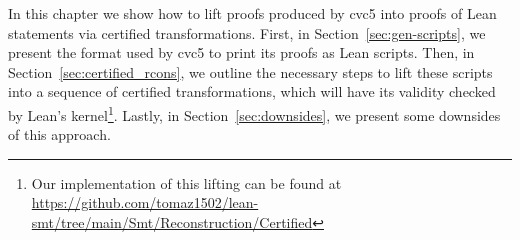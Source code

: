 In this chapter we show how to lift proofs produced by cvc5 into
proofs of Lean statements via certified transformations.
First, in Section~\ref{sec:gen-scripts}, we present the format used by
cvc5 to print its proofs as Lean scripts.
Then, in Section~\ref{sec:certified_rcons}, we outline the necessary
steps to lift these scripts into a sequence of certified transformations,
which will have its validity checked by Lean's kernel\footnote{Our implementation of this lifting can be found at \url{https://github.com/tomaz1502/lean-smt/tree/main/Smt/Reconstruction/Certified}}.
Lastly, in Section~\ref{sec:downsides}, we present some downsides of this approach.
